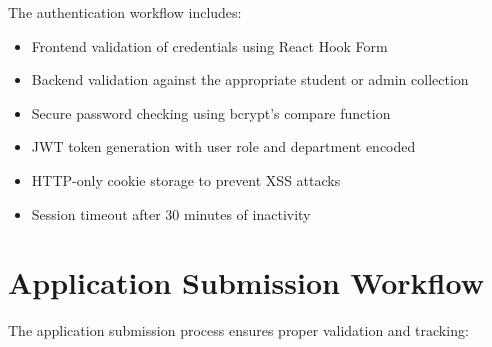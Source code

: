 \documentclass[12pt,a4paper]{report}
\begin{document}
The authentication workflow includes:
\begin{itemize}
    \item Frontend validation of credentials using React Hook Form
    \item Backend validation against the appropriate student or admin collection
    \item Secure password checking using bcrypt's compare function
    \item JWT token generation with user role and department encoded
    \item HTTP-only cookie storage to prevent XSS attacks
    \item Session timeout after 30 minutes of inactivity
\end{itemize}

\section{Application Submission Workflow}
The application submission process ensures proper validation and tracking:
\end{document}
